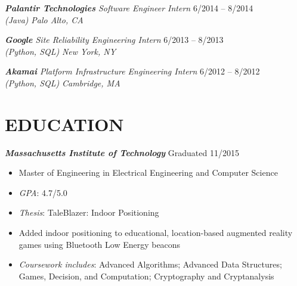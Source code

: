 \documentclass[margin]{res}
\begin{document}
\begin{resume}
                    {\sl{\bf Palantir Technologies} Software Engineer Intern} 
                    \hfill 6/2014 -- 8/2014 \\
                    {\sl (Java)}
                    \hfill{\sl  Palo Alto, CA}


                    {\sl{\bf Google} Site Reliability Engineering Intern} 
                    \hfill 6/2013 -- 8/2013 \\
                    {\sl (Python, SQL)}
                    \hfill {\sl  New York, NY}


                    {\sl {\bf Akamai} 
                      Platform Infrastructure Engineering Intern} 
                    \hfill 6/2012 -- 8/2012 \\
                    {\sl (Python, SQL)}
                    \hfill {\sl Cambridge, MA}


\section{EDUCATION} {\sl \bf Massachusetts Institute of Technology} 
                    \hfill Graduated 11/2015
                    \begin{itemize} \itemsep -2pt %
                        \item Master of Engineering in Electrical Engineering
                          and Computer Science
                        \item {\sl GPA}: 4.7/5.0
                        \item {\sl Thesis}: TaleBlazer: Indoor Positioning
                        \item Added indoor positioning to
                          educational, location-based augmented reality games
                          using Bluetooth Low Energy beacons
                        \item {\sl Coursework includes}:
                          Advanced Algorithms;
                          Advanced Data Structures;
                          Games, Decision, and Computation;
                          Cryptography and Cryptanalysis
                    \end{itemize}


\end{resume}
\end{document}
